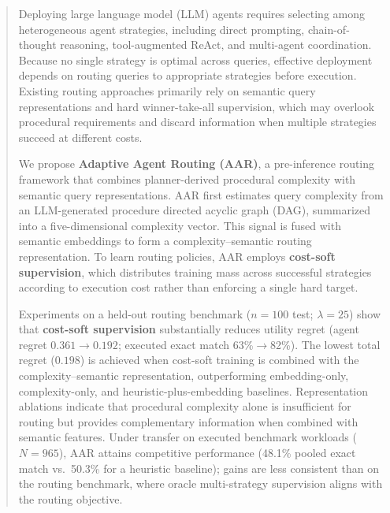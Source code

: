 \begin{abstract}
Deploying large language model (LLM) agents requires selecting among heterogeneous agent
strategies, including direct prompting, chain-of-thought reasoning, tool-augmented ReAct, and
multi-agent coordination.
Because no single strategy is optimal across queries, effective deployment depends on routing
queries to appropriate strategies before execution.
Existing routing approaches primarily rely on semantic query representations and hard
winner-take-all supervision, which may overlook procedural requirements and discard information
when multiple strategies succeed at different costs.

We propose \textbf{Adaptive Agent Routing (AAR)}, a pre-inference routing framework that combines
planner-derived procedural complexity with semantic query representations.
AAR first estimates query complexity from an LLM-generated procedure directed acyclic graph
(DAG), summarized into a five-dimensional complexity vector.
This signal is fused with semantic embeddings to form a complexity--semantic routing
representation.
To learn routing policies, AAR employs \textbf{cost-soft supervision}, which distributes
training mass across successful strategies according to execution cost rather than enforcing a
single hard target.

Experiments on a held-out routing benchmark ($n{=}100$ test; $\lambda{=}25$) show that
\textbf{cost-soft supervision} substantially reduces utility regret (agent regret
$0.361\to 0.192$; executed exact match 63\%$\to$82\%).
The lowest total regret ($0.198$) is achieved when cost-soft training is combined with the
complexity--semantic representation, outperforming embedding-only, complexity-only, and
heuristic-plus-embedding baselines.
Representation ablations indicate that procedural complexity alone is insufficient for routing
but provides complementary information when combined with semantic features.
Under transfer on executed benchmark workloads ($N{=}965$), AAR attains competitive performance
(48.1\% pooled exact match vs.\ 50.3\% for a heuristic baseline); gains are less consistent
than on the routing benchmark, where oracle multi-strategy supervision aligns with the routing
objective.
\end{abstract}
